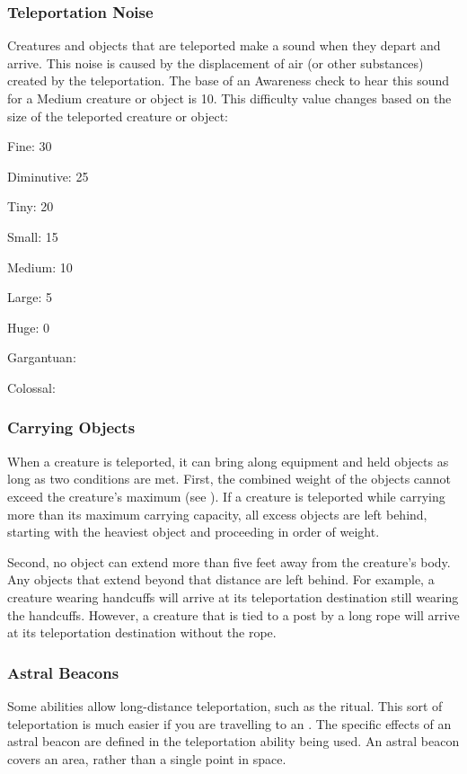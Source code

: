     \subsubsection{Teleportation Noise}\label{Teleportation Noise}
      Creatures and objects that are teleported make a sound when they depart and arrive.
      This noise is caused by the displacement of air (or other substances) created by the teleportation.
      The base  of an Awareness check to hear this sound for a Medium creature or object is 10.
      This difficulty value changes based on the size of the teleported creature or object:

      \begin{raggeditemize}
        \item Fine: 30
        \item Diminutive: 25
        \item Tiny: 20
        \item Small: 15
        \item Medium: 10
        \item Large: 5
        \item Huge: 0
        \item Gargantuan: 
        \item Colossal: 
      \end{raggeditemize}

    \subsubsection{Carrying Objects}
      When a creature is teleported, it can bring along equipment and held objects as long as two conditions are met.
      First, the combined weight of the objects cannot exceed the creature's maximum  (see ).
      If a creature is teleported while carrying more than its maximum carrying capacity, all excess objects are left behind, starting with the heaviest object and proceeding in order of weight.

      Second, no object can extend more than five feet away from the creature's body.
      Any objects that extend beyond that distance are left behind.
      For example, a creature wearing handcuffs will arrive at its teleportation destination still wearing the handcuffs.
      However, a creature that is tied to a post by a long rope will arrive at its teleportation destination without the rope.

    \subsubsection{Astral Beacons}\label{Astral Beacons}
      Some abilities allow long-distance teleportation, such as the  ritual.
      This sort of teleportation is much easier if you are travelling to an .
      The specific effects of an astral beacon are defined in the teleportation ability being used.
      An astral beacon covers an area, rather than a single point in space.

